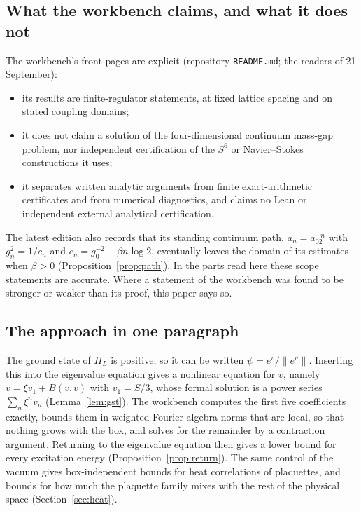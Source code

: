 \subsection{What the workbench claims, and what it does not}

The workbench's front pages are explicit (repository \texttt{README.md}; the readers of 21 September):
\begin{itemize}
\item its results are finite-regulator statements, at fixed lattice spacing and on stated coupling domains;
\item it does not claim a solution of the four-dimensional continuum mass-gap problem, nor independent certification of the $S^6$ or Navier--Stokes constructions it uses;
\item it separates written analytic arguments from finite exact-arithmetic certificates and from numerical diagnostics, and claims no Lean or independent external analytical certification.
\end{itemize}
The latest edition also records that its standing continuum path, $a_n=a_02^{-n}$ with $g_n^2=1/c_n$ and $c_n=g_0^{-2}+\beta n\log2$, eventually leaves the domain of its estimates when $\beta>0$ (Proposition~\ref{prop:path}). In the parts read here these scope statements are accurate. Where a statement of the workbench was found to be stronger or weaker than its proof, this paper says so.

\subsection{The approach in one paragraph}

The ground state of $H_L$ is positive, so it can be written $\psi=e^v/\|e^v\|$. Inserting this into the eigenvalue equation gives a nonlinear equation for $v$, namely $v=\xi v_1+B(v,v)$ with $v_1=S/3$, whose formal solution is a power series $\sum_n\xi^nv_n$ (Lemma~\ref{lem:gst}). The workbench computes the first five coefficients exactly, bounds them in weighted Fourier-algebra norms that are local, so that nothing grows with the box, and solves for the remainder by a contraction argument. Returning to the eigenvalue equation then gives a lower bound for every excitation energy (Proposition~\ref{prop:return}). The same control of the vacuum gives box-independent bounds for heat correlations of plaquettes, and bounds for how much the plaquette family mixes with the rest of the physical space (Section~\ref{sec:heat}).
